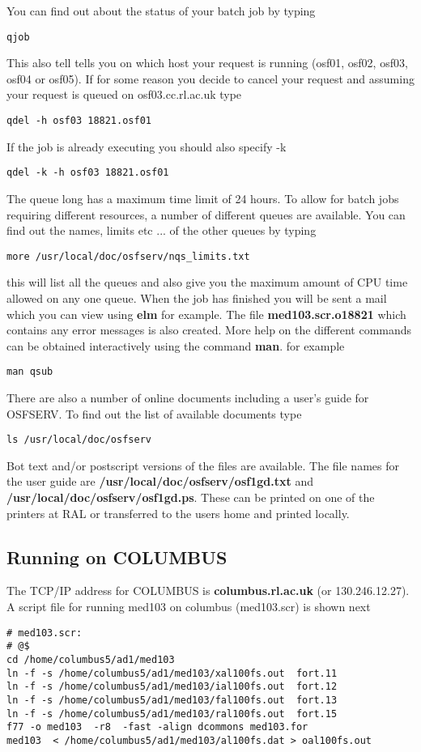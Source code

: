 You can find out about the status of your batch job by typing
\begin{verbatim}
qjob
\end{verbatim}
This also tell tells you on which host your request is running (osf01, osf02, osf03, osf04 or osf05).
If for some reason you decide to cancel your request and assuming your request is queued on osf03.cc.rl.ac.uk
type
\begin{verbatim}
qdel -h osf03 18821.osf01
\end{verbatim}
If the job is already executing you should also specify -k
\begin{verbatim}
qdel -k -h osf03 18821.osf01
\end{verbatim}
The queue long has a maximum time limit of 24 hours.
To allow for batch jobs requiring different resources,
a number of different queues are available.
You can  find out the names, limits etc ...  of the other queues by
typing
\begin{verbatim}
more /usr/local/doc/osfserv/nqs_limits.txt
\end{verbatim}
this will list all the queues and also give
you the maximum amount of CPU time allowed on any one queue.
When the job has finished you will be sent a mail which you can view using {\bf elm} for example. 
The file {\bf med103.scr.o18821} which contains any error messages is also created.
More help on the different commands can be obtained interactively using the command {\bf man}. for example
\begin{verbatim}
man qsub
\end{verbatim}
There are also a number of online documents including a user's guide for OSFSERV. To find out the list of
available documents type
\begin{verbatim}
ls /usr/local/doc/osfserv
\end{verbatim}
Bot text and/or postscript versions of the files are available. The file names for the user guide are
{\bf /usr/local/doc/osfserv/osf1gd.txt} and {\bf /usr/local/doc/osfserv/osf1gd.ps}. These can be printed on
one of the printers at RAL or transferred to the users home and printed locally.
               

\subsection{Running on COLUMBUS}
The TCP/IP address for COLUMBUS is {\bf columbus.rl.ac.uk}
(or 130.246.12.27).
A script file for running
med103 on columbus (med103.scr) is shown next
\begin{verbatim}
# med103.scr:
# @$
cd /home/columbus5/ad1/med103
ln -f -s /home/columbus5/ad1/med103/xal100fs.out  fort.11
ln -f -s /home/columbus5/ad1/med103/ial100fs.out  fort.12
ln -f -s /home/columbus5/ad1/med103/fal100fs.out  fort.13
ln -f -s /home/columbus5/ad1/med103/ral100fs.out  fort.15
f77 -o med103  -r8  -fast -align dcommons med103.for
med103  < /home/columbus5/ad1/med103/al100fs.dat > oal100fs.out
\end{verbatim}

